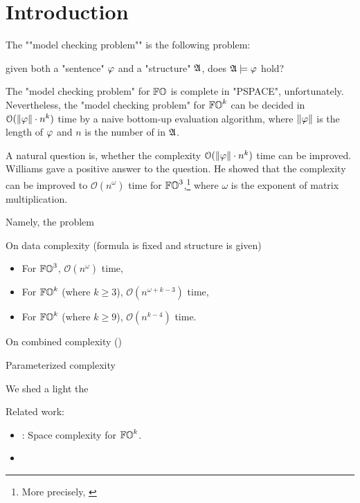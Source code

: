 \section{Introduction}\label{sec: introduction}

The ""model checking problem"" is the following problem:
\begin{center}
given both a "sentence" $\fml$ and a "structure" $\struc$, does $\struc \models \fml$ hold?
\end{center}
The "model checking problem" for $\mathbb{FO}$ is complete in "PSPACE", unfortunately.
Nevertheless, the "model checking problem" for $\mathbb{FO}^{k}$ can be decided in $\mathcal{O}(\len{\fml} \cdot n^{k})$ time \cite[Proposition 3.1]{vardiComplexityBoundedvariableQueries1995}
by a naive bottom-up evaluation algorithm,
where $\len{\fml}$ is the length of $\fml$ and $n$ is the number of  in $\struc$.


A natural question is, whether the complexity $\mathcal{O}(\len{\fml} \cdot n^{k})$ time can be improved.
Williams \cite{williamsFasterDecisionFirstorder2014} gave a positive answer to the question.
He showed that the complexity can be improved to $\mathcal{O}(n^{\omega})$ time for $\mathbb{FO}^{3}$,\footnote{More precisely, \cite[Theorem 7]{gaoFineGrainedComplexityStrengthenings2019}} where $\omega$ is the exponent of matrix multiplication.

Namely, the problem 
\begin{yoshiki}
    On data complexity (formula is fixed and structure is given) \cite{williamsFasterDecisionFirstorder2014}
    \begin{itemize}
        \item For $\mathbb{FO}^{3}$, $\mathcal{O}(n^{\omega})$ time,
        \item For $\mathbb{FO}^{k}$ (where $k \ge 3$), $\mathcal{O}(n^{\omega + k - 3})$ time,
        \item For $\mathbb{FO}^{k}$ (where $k \ge 9$), $\mathcal{O}(n^{k - 4})$ time.
    \end{itemize}
    
    On combined complexity ()

    Parameterized complexity 
\end{yoshiki}

We shed a light the 


Related work:
\begin{itemize}
    \item \cite{chenParameterizedSpaceComplexity2019}: Space complexity for $\mathbb{FO}^{k}$.
    \item 
\end{itemize}
